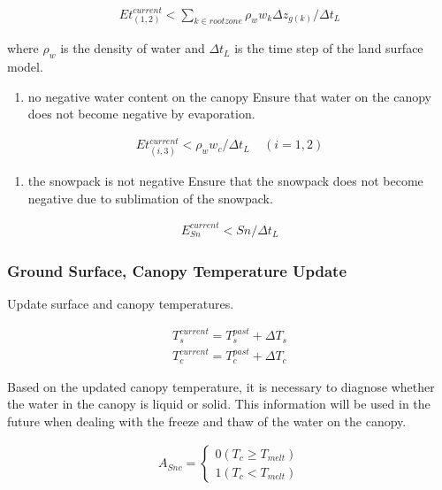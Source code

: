 \begin{eqnarray}
   Et_{(1,2)}^{current} <
     \sum_{k\in rootzone} \rho_w w_{k}\Delta z_{g(k)} /\Delta t_L
\end{eqnarray}

where \(\rho_w\) is the density of water and \(\Delta t_L\) is the time
step of the land surface model.

\begin{enumerate}
\def\labelenumi{\arabic{enumi}.}
\setcounter{enumi}{2}
\tightlist
\item
  no negative water content on the canopy Ensure that water on the
  canopy does not become negative by evaporation.
\end{enumerate}

\begin{eqnarray}
   Et_{(i,3)}^{current} < \rho_w w_c /\Delta t_L
   \ \ \ \ \ (i=1,2)
\end{eqnarray}

\begin{enumerate}
\def\labelenumi{\arabic{enumi}.}
\setcounter{enumi}{3}
\tightlist
\item
  the snowpack is not negative Ensure that the snowpack does not become
  negative due to sublimation of the snowpack.
\end{enumerate}

\begin{eqnarray}
   E_{Sn}^{current} < Sn /\Delta t_L
\end{eqnarray}

\hypertarget{ground-surface-canopy-temperature-update}{%
\subsubsection{Ground Surface, Canopy Temperature
Update}\label{ground-surface-canopy-temperature-update}}

Update surface and canopy temperatures.

\begin{eqnarray}
 T_s^{current} = T_s^{past} + \Delta T_s \\
 T_c^{current} = T_c^{past} + \Delta T_c
\end{eqnarray}

Based on the updated canopy temperature, it is necessary to diagnose
whether the water in the canopy is liquid or solid. This information
will be used in the future when dealing with the freeze and thaw of the
water on the canopy.

\begin{eqnarray}
 A_{Snc} = \left\{
\begin{array}{ll}
 0 (T_c \geq T_{melt})\\
 1 (T_c <    T_{melt})
\end{array}
\right.
\end{eqnarray}

